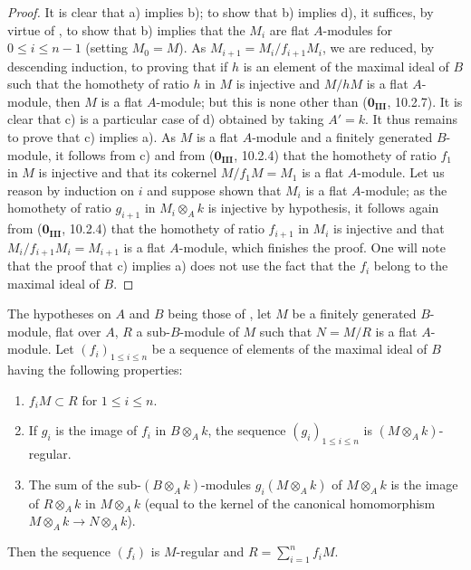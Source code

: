 \begin{proof}
It is clear that a) implies b);
to show that b) implies d), it suffices, by virtue of , to show that b) implies that the $M_i$ are flat $A$-modules for $0\leq i\leq n-1$ (setting $M_0=M$).
As $M_{i+1}=M_i/f_{i+1}M_i$, we are reduced, by descending induction, to proving that if $h$ is an element of the maximal ideal of $B$ such that the homothety of ratio $h$ in $M$ is injective and $M/hM$ is a flat $A$-module, then $M$ is a flat $A$-module;
but this is none other than ($\mathbf{0_{III}}$, 10.2.7).
It is clear that c) is a particular case of d) obtained by taking $A'=k$.
It thus remains to prove that c) implies a).
As $M$ is a flat $A$-module and a finitely generated $B$-module, it follows from c) and from ($\mathbf{0_{III}}$, 10.2.4) that the homothety of ratio $f_1$ in $M$ is injective and that its cokernel $M/f_1M=M_1$ is a flat $A$-module.
Let us reason by induction on $i$ and suppose shown that $M_i$ is a flat $A$-module;
as the homothety of ratio $g_{i+1}$ in $M_i\otimes_Ak$ is injective by hypothesis, it follows again from ($\mathbf{0_{III}}$, 10.2.4) that the homothety of ratio $f_{i+1}$ in $M_i$ is injective and that $M_i/f_{i+1}M_i=M_{i+1}$ is a flat $A$-module, which finishes the proof.
One will note that the proof that c) implies a) does not use the fact that the $f_i$ belong to the maximal ideal of $B$.
\end{proof}

\begin{corollary}[15.1.17]
\label{0.15.1.17}
The hypotheses on $A$ and $B$ being those of , let $M$ be a finitely generated $B$-module, flat over $A$, $R$ a sub-$B$-module of $M$ such that $N=M/R$ is a flat $A$-module.
Let $(f_i)_{1\leq i\leq n}$ be a sequence of elements of the maximal ideal of $B$ having the following properties:
\begin{enumerate}
  \item[(i)] $f_iM\subset R$ for $1\leq i\leq n$.
  \item[(ii)] If $g_i$ is the image of $f_i$ in $B\otimes_Ak$, the sequence $(g_i)_{1\leq i\leq n}$ is $(M\otimes_Ak)$-regular.
  \item[(iii)] The sum of the sub-$(B\otimes_Ak)$-modules $g_i(M\otimes_Ak)$ of $M\otimes_Ak$ is the image of $R\otimes_Ak$ in $M\otimes_Ak$ (equal to the kernel of the canonical homomorphism $M\otimes_Ak\to N\otimes_Ak$).
\end{enumerate}
Then the sequence $(f_i)$ is $M$-regular and $R=\sum_{i=1}^n f_iM$.
\end{corollary}

